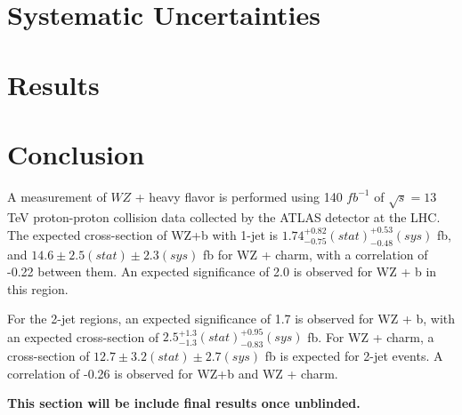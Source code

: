 \documentclass[NOTE, atlasdraft=true, texlive=2016, UKenglish]{\ATLASLATEXPATH atlasdoc}
\begin{document}
%

\section{Systematic Uncertainties}
\label{sec:sys}


\section{Results}
\label{sec:results}



\section{Conclusion}
\label{sec:conclusion}

A measurement of $WZ$ + heavy flavor is performed using 140 $fb^{-1}$ of $\sqrt{s} = 13$ TeV proton-proton collision data collected by the ATLAS detector at the LHC. The expected cross-section of WZ+b with 1-jet is $1.74^{+0.82}_{-0.75}(stat)^{+0.53}_{-0.48}(sys)$ fb, and $14.6 \pm 2.5 (stat) \pm 2.3 (sys)$ fb for WZ + charm, with a correlation of -0.22 between them. An expected significance of 2.0 is observed for WZ + b in this region.

For the 2-jet regions, an expected significance of 1.7 is observed for WZ + b, with an expected cross-section of $2.5^{+1.3}_{-1.3}(stat)^{+0.95}_{-0.83}(sys)$ fb. For WZ + charm, a cross-section of $12.7 \pm 3.2 (stat) \pm 2.7 (sys)$ fb is expected for 2-jet events. A correlation of -0.26 is observed for WZ+b and WZ + charm.

\textbf{This section will be include final results once unblinded.}%
\end{document}
